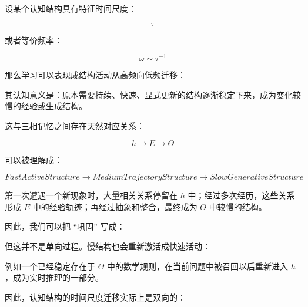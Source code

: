 设某个认知结构具有特征时间尺度：

\[
\tau
\]

或者等价频率：

\[
\omega
\sim
\tau^{-1}
\]

那么学习可以表现成结构活动从高频向低频迁移：

\begin{statementbox}
\centering
{}
\end{statementbox}

其认知意义是：原本需要持续、快速、显式更新的结构逐渐稳定下来，成为变化较慢的经验或生成结构。

这与三相记忆之间存在天然对应关系：

\[
h
\rightarrow
E
\rightarrow
\Theta
\]

可以被理解成：

\[
FastActiveStructure
\rightarrow
MediumTrajectoryStructure
\rightarrow
SlowGenerativeStructure
\]

第一次遭遇一个新现象时，大量相关关系停留在 $h$ 中；经过多次经历，这些关系形成 $E$ 中的经验轨迹；再经过抽象和整合，最终成为 $\Theta$ 中较慢的结构。

因此，我们可以把 ``巩固'' 写成：

\begin{statementbox}
\centering
{}
\end{statementbox}

但这并不是单向过程。慢结构也会重新激活成快速活动：

\begin{statementbox}
\centering
{}
\end{statementbox}

例如一个已经稳定存在于 $\Theta$ 中的数学规则，在当前问题中被召回以后重新进入 $h$，成为实时推理的一部分。

因此，认知结构的时间尺度迁移实际上是双向的：

\begin{statementbox}
\centering
{}
\end{statementbox}

\begin{statementbox}
\centering
{}
\end{statementbox}

